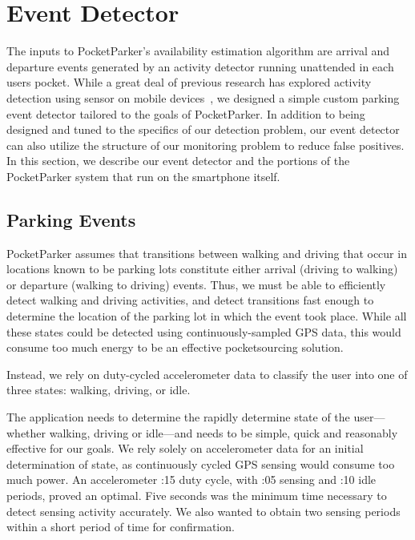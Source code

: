 \section{Event Detector}
\label{sec-detector}

The inputs to PocketParker's availability estimation algorithm are arrival
and departure events generated by an activity detector running unattended in
each users pocket. While a great deal of previous research has explored
activity detection using sensor on mobile devices~\cite{FIXME}, we designed a
simple custom parking event detector tailored to the goals of PocketParker.
In addition to being designed and tuned to the specifics of our detection
problem, our event detector can also utilize the structure of our monitoring
problem to reduce false positives. In this section, we describe our event
detector and the portions of the PocketParker system that run on the
smartphone itself.

\subsection{Parking Events}
\label{subsec-goals}

PocketParker assumes that transitions between walking and driving that occur
in locations known to be parking lots constitute either arrival (driving to
walking) or departure (walking to driving) events. Thus, we must be able to
efficiently detect walking and driving activities, and detect transitions
fast enough to determine the location of the parking lot in which the event
took place. While all these states could be detected using
continuously-sampled GPS data, this would consume too much energy to be an
effective pocketsourcing solution.

Instead, we rely on duty-cycled accelerometer data to classify the user into
one of three states: walking, driving, or idle.

The application needs to determine the rapidly determine state of the user---whether walking,
driving or idle---and needs to be simple, quick and reasonably effective
for our goals. We rely solely on accelerometer data for an initial
determination of state, as continuously cycled GPS sensing would consume too
much power. An accelerometer :15 duty cycle, with :05 sensing and :10 idle
periods, proved an optimal. Five seconds was the minimum time necessary to
detect sensing activity accurately. We also wanted to obtain two sensing
periods within a short period of time for confirmation.

